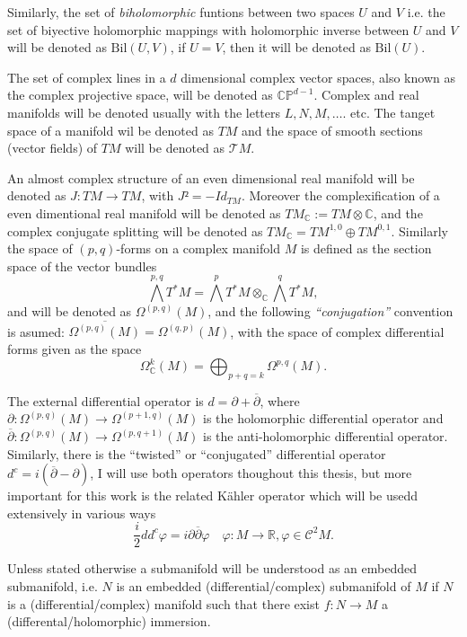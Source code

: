 \documentclass[12pt,twoside,a4paper]{report}
\newcommand{\re}{\ensuremath{\mathbb R }}
\newcommand{\co}{\ensuremath{\mathbb C }}
\newcommand{\cp}{\ensuremath{\mathbb{CP}}}
\newcommand{\om}{\ensuremath{\Omega}}
\newcommand{\csheaf}{\ensuremath{\mathcal C }}
\begin{document}
  Similarly, the set of \emph{biholomorphic} funtions between two spaces $U$ and $V$ i.e. the set of biyective holomorphic mappings with holomorphic inverse between $U$ and $V$ will be denoted as $\mathrm{Bil}(U,V)$, if $U=V$, then it will be denoted as $\mathrm{Bil}(U).$

  The set of complex lines in a $d$ dimensional complex vector spaces, also known as the complex projective space, will be denoted as $\cp^{d-1}$. Complex and real manifolds will be denoted usually with the letters $L, N, M,\dots$. etc. The tanget space of a manifold wil be denoted as $TM$ and the space of smooth sections (vector fields) of $TM$ will be denoted as $\mathcal{T}M$.

  An almost complex structure of an even dimensional real manifold will be denoted as $J:TM\rightarrow TM$, with $J²=-Id_{TM}$. Moreover the complexification of a even dimentional real manifold will be denoted as $TM_{\co}:=TM\otimes\co$, and the complex conjugate splitting will be denoted as $TM_{\co}=TM^{1,0}\oplus TM^{0,1}$.
  Similarly the space of $(p,q)$-forms on a complex manifold $M$ is  defined as the section space of the vector bundles
  \[
    \bigwedge^{p,q}T^{*}M=\bigwedge^{p}T^{*}M\otimes_{\co}\bigwedge^{q}T^{*}M,
  \]
  \noindent and will be denoted as $\Omega^{(p,q)}(M)$, and the following \emph{``conjugation''} convention is asumed: $\overline{\om^{(p,q)}(M)}=\om^{(q,p)}(M)$, with the space of complex differential forms given as the space
  \[
    \om^{k}_{\co}(M)=\bigoplus_{p+q=k}\om^{p,q}(M).
  \]

  The external differential operator is $d=\partial + \overline{\partial}$, where $\partial:\om^{(p,q)}(M)\rightarrow \om^{(p+1,q)}(M)$ is the holomorphic differential operator and $\overline{\partial}:\om^{(p,q)}(M)\rightarrow\om^{(p,q+1)}(M)$ is the anti-holomorphic differential operator. Similarly, there is the ``twisted'' or ``conjugated'' differential operator $d^c=i(\overline{\partial}-\partial)$, I will use both operators thoughout this thesis, but more important for this work is the related Kähler operator which will be usedd extensively in various ways
  \[
    \frac{i}{2}dd^c\varphi=i\partial\overline{\partial}\varphi\quad\varphi:M\to\re,\varphi\in\csheaf^2{M}.
  \]

  Unless stated otherwise a submanifold will be understood as an embedded submanifold, i.e. $N$ is an embedded (differential/complex) submanifold of $M$ if $N$ is a (differential/complex) manifold such that there exist $f:N\rightarrow M$ a (differental/holomorphic) immersion.
\end{document}
